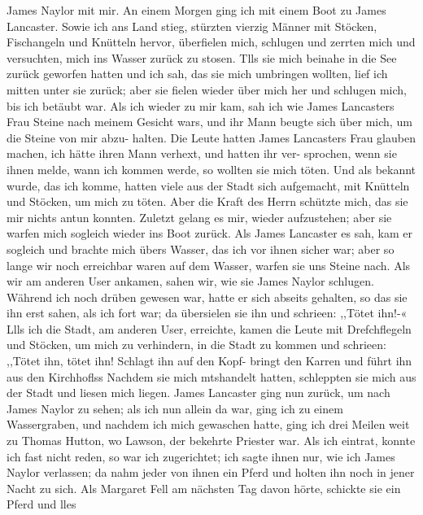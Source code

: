 James Naylor mit mir. An einem Morgen ging ich mit einem
Boot zu James Lancaster. Sowie ich ans Land stieg, stürzten vierzig
Männer mit Stöcken, Fischangeln und Knütteln hervor, überfielen
mich, schlugen und zerrten mich und versuchten, mich ins Wasser zurück
zu stosen. Tlls sie mich beinahe in die See zurück geworfen hatten
und ich sah, das sie mich umbringen wollten, lief ich mitten unter sie
zurück; aber sie fielen wieder über mich her und schlugen mich,
bis ich betäubt war. Als ich wieder zu mir kam, sah ich wie
James Lancasters Frau Steine nach meinem Gesicht wars, und
ihr Mann beugte sich über mich, um die Steine von mir abzu-
halten. Die Leute hatten James Lancasters Frau glauben
machen, ich hätte ihren Mann verhext, und hatten ihr ver-
sprochen, wenn sie ihnen melde, wann ich kommen werde, so
wollten sie mich töten. Und als bekannt wurde, das ich komme,
hatten viele aus der Stadt sich aufgemacht, mit Knütteln und
Stöcken, um mich zu töten. Aber die Kraft des Herrn
schützte mich, das sie mir nichts antun konnten. Zuletzt gelang
es mir, wieder aufzustehen; aber sie warfen mich sogleich wieder
ins Boot zurück. Als James Lancaster es sah, kam er sogleich
und brachte mich übers Wasser, das ich vor ihnen sicher war;
aber so lange wir noch erreichbar waren auf dem Wasser, warfen
sie uns Steine nach. Als wir am anderen User ankamen, sahen
wir, wie sie James Naylor schlugen. Während ich noch drüben
gewesen war, hatte er sich abseits gehalten, so das sie ihn erst sahen,
als ich fort war; da übersielen sie ihn und schrieen: ,,Tötet ihn!-«
Llls ich die Stadt, am anderen User, erreichte, kamen die
Leute mit Drefchflegeln und Stöcken, um mich zu verhindern, in
die Stadt zu kommen und schrieen: ,,Tötet ihn, tötet ihn! Schlagt
ihn auf den Kopf- bringt den Karren und führt ihn aus den
Kirchhoflss Nachdem sie mich mtshandelt hatten, schleppten sie
mich aus der Stadt und liesen mich liegen. James Lancaster
ging nun zurück, um nach James Naylor zu sehen; als ich nun
allein da war, ging ich zu einem Wassergraben, und nachdem ich
mich gewaschen hatte, ging ich drei Meilen weit zu Thomas
Hutton, wo Lawson, der bekehrte Priester war. Als ich eintrat,
konnte ich fast nicht reden, so war ich zugerichtet; ich sagte ihnen nur,
wie ich James Naylor verlassen; da nahm jeder von ihnen ein
Pferd und holten ihn noch in jener Nacht zu sich. Als Margaret
Fell am nächsten Tag davon hörte, schickte sie ein Pferd und lles


